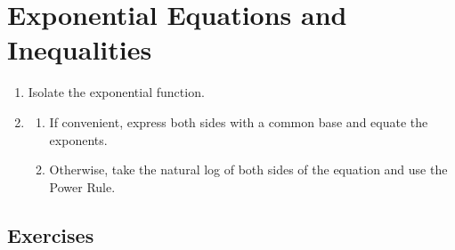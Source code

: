 \section{Exponential Equations and Inequalities}

\begin{procedure}
    \leavevmode
    \begin{enumerate}
        \item Isolate the exponential function.
        \item \begin{enumerate}[label=\alph*]
                  \item If convenient, express both sides with a common base and equate the exponents.
                  \item Otherwise, take the natural log of both sides of the equation and use the Power Rule.
              \end{enumerate}
    \end{enumerate}
\end{procedure}

\subsection{Exercises}
